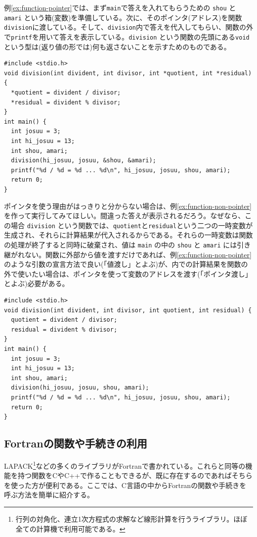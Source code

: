 例\ref{ex:function-pointer}では、まず{\tt main}で答えを入れてもらうための \verb|shou| と \verb|amari| という箱(変数)を準備している。次に、そのポインタ(アドレス)を関数\verb|division|に渡している。そして、\verb|division|内で答えを代入してもらい、関数の外で\verb|printf|を用いて答えを表示している。\verb|division| という関数の先頭にある\verb|void|という型は(返り値の形では)何も返さないことを示すためのものである。
\begin{reidai}\label{ex:function-pointer}
\begin{verbatim}
#include <stdio.h>
void division(int divident, int divisor, int *quotient, int *residual) {
  *quotient = divident / divisor;
  *residual = divident % divisor;
}
int main() {
  int josuu = 3;
  int hi_josuu = 13;
  int shou, amari;
  division(hi_josuu, josuu, &shou, &amari);
  printf("%d / %d = %d ... %d\n", hi_josuu, josuu, shou, amari);
  return 0;
}
\end{verbatim}
\end{reidai} \noindent
ポインタを使う理由がはっきりと分からない場合は、例\ref{ex:function-non-pointer}を作って実行してみてほしい。間違った答えが表示されるだろう。なぜなら、この場合 \verb|division| という関数では、\verb|quotient|と\verb|residual|という二つの一時変数が生成され、それらに計算結果が代入されるからである。それらの一時変数は関数の処理が終了すると同時に破棄され、値は \verb|main| の中の \verb|shou| と \verb|amari| には引き継がれない。関数に外部から値を渡すだけであれば、例\ref{ex:function-non-pointer}のような引数の宣言方法で良い(「値渡し」とよぶ)が、内での計算結果を関数の外で使いたい場合は、ポインタを使って変数のアドレスを渡す(「ポインタ渡し」とよぶ)必要がある。
\begin{reidai}\label{ex:function-non-pointer}
\begin{verbatim}
#include <stdio.h>
void division(int divident, int divisor, int quotient, int residual) {
  quotient = divident / divisor;
  residual = divident % divisor;
}
int main() {
  int josuu = 3;
  int hi_josuu = 13;
  int shou, amari;
  division(hi_josuu, josuu, shou, amari);
  printf("%d / %d = %d ... %d\n", hi_josuu, josuu, shou, amari);
  return 0;
}
\end{verbatim}
\end{reidai}

\subsection {Fortranの関数や手続きの利用}

LAPACK\footnote{行列の対角化、連立1次方程式の求解など線形計算を行うライブラリ。ほぼ全ての計算機で利用可能である。}などの多くのライブラリがFortranで書かれている。これらと同等の機能を持つ関数をCやC++で作ることもできるが、既に存在するのであればそちらを使った方が便利である。ここでは、C言語の中からFortranの関数や手続きを呼ぶ方法を簡単に紹介する。


